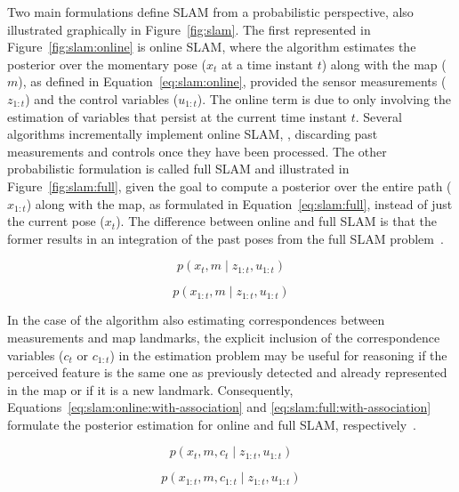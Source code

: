 Two main formulations define \gls{SLAM} from a probabilistic perspective, also illustrated graphically in Figure~\ref{fig:slam}.
The first represented in Figure~\ref{fig:slam:online} is online \gls{SLAM}, where the algorithm estimates the posterior over the momentary pose ($x_t$ at a time instant $t$) along with the map ($m$), as defined in Equation~\ref{eq:slam:online}, provided the sensor measurements ($z_{1:t}$) and the control variables ($u_{1:t}$). The online term is due to only involving the estimation of variables that persist at the current time instant $t$. Several algorithms incrementally implement online \gls{SLAM}, \ie, discarding past measurements and controls once they have been processed. The other probabilistic formulation is called full \gls{SLAM} and illustrated in Figure~\ref{fig:slam:full}, given the goal to compute a posterior over the entire path ($x_{1:t}$) along with the map, as formulated in Equation~\ref{eq:slam:full}, instead of just the current pose ($x_t$). The difference between online and full \gls{SLAM} is that the former results in an integration of the past poses from the full \gls{SLAM} problem~\cite{book:probabilistic-robotics}.

\begin{equation}\label{eq:slam:online}
p\left(x_t,m \;\vert\; z_{1:t},u_{1:t}\right)
\end{equation}

\begin{equation}\label{eq:slam:full}
p\left(x_{1:t},m \;\vert\; z_{1:t},u_{1:t}\right)
\end{equation}

In the case of the algorithm also estimating correspondences between measurements and map landmarks, the explicit inclusion of the correspondence variables ($c_t$ or $c_{1:t}$) in the estimation problem may be useful for reasoning if the perceived feature is the same one as previously detected and already represented in the map or if it is a new landmark.
Consequently, Equations~\ref{eq:slam:online:with-association} and \ref{eq:slam:full:with-association} formulate the posterior estimation for online and full \gls{SLAM}, respectively~\cite{book:probabilistic-robotics}.

\begin{equation}\label{eq:slam:online:with-association}
p\left(x_t,m,c_t \;\vert\; z_{1:t},u_{1:t}\right)
\end{equation}

\begin{equation}\label{eq:slam:full:with-association}
p\left(x_{1:t},m,c_{1:t} \;\vert\; z_{1:t},u_{1:t}\right)
\end{equation}

